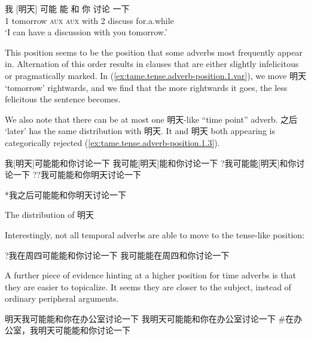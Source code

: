 \documentclass[UTF8, a4paper, oneside, scheme=plain, 12pt]{ctexrep}
\newcommand{\translate}[1]{`#1'}
\newcommand*{\category}[1]{\textsc{#1}}
\begin{document}
\begin{exe}
    \ex\label{ex:tame.tense.adverb-position.1}
    \gll 我 [明天] 可能 能 和 你 讨论 一下 \\
    1 tomorrow \category{aux} \category{aux} with 2 discuss for.a.while \\
    \glt\translate{I can have a discussion with you tomorrow.}
\end{exe}

This position seems to be the position that some adverbs most frequently appear in.
Alternation of this order results in 
clauses that are either slightly infelicitous 
or pragmatically marked. 
In (\ref{ex:tame.tense.adverb-position.1.var}),
we move 明天 \translate{tomorrow} rightwards,
and we find that the more rightwards it goes,
the less felicitous the sentence becomes.

We also note that there can be at most one 明天-like ``time point'' adverb.
之后 \translate{later} has the same distribution with 明天.
It and 明天 both appearing is categorically rejected 
(\ref{ex:tame.tense.adverb-position.1.3}).

\begin{exe}
    \ex\label{ex:tame.tense.adverb-position.1.var} \begin{xlist}
        \ex 我[明天]可能能和你讨论一下
        \ex 我可能[明天]能和你讨论一下
        \ex ?我可能能[明天]和你讨论一下
        \ex ??我可能能和你明天讨论一下
    \end{xlist}

    \ex\label{ex:tame.tense.adverb-position.1.3} *我之后可能能和你明天讨论一下
\end{exe}

The distribution of 明天 

Interestingly, not all temporal adverbs are able to move to the tense-like position: 

\begin{exe}
    \ex \begin{xlist}
        \ex ?我在周四可能能和你讨论一下
        \ex 我可能能在周四和你讨论一下
    \end{xlist}
\end{exe}




A further piece of evidence hinting at a higher position for time adverbs 
is that they are easier to topicalize.
It seems they are closer to the subject, 
instead of ordinary peripheral arguments.

\begin{exe}
    \ex 明天我可能能和你在办公室讨论一下
    \ex 我明天可能能和你在办公室讨论一下
    \ex \#在办公室，我明天可能能和你讨论一下
\end{exe}
\end{document}
